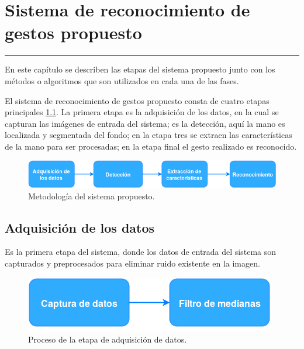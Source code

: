 \chapter{Sistema de reconocimiento de gestos propuesto}\label{capit:cap3}
\vspace{-2.0325ex}%
\noindent
\rule{\textwidth}{0.5pt}
\vspace{-5.5ex}%
\newcommand{\pushline}{\Indp}%

En este cap\'itulo se describen las etapas del sistema propuesto junto con los métodos o algoritmos que son utilizados en cada una de las fases.
 
El sistema de reconocimiento de gestos propuesto consta de cuatro etapas principales \ref{fig:MyHGR}. La primera etapa es la adquisición de los datos, en la cual se capturan las imágenes de entrada del sistema; es la detección, aquí la mano es localizada y segmentada del fondo; en la etapa tres se extraen las características de la mano para ser procesadas; en la etapa final el gesto realizado es reconocido.   

\begin{figure}[h!]
\begin{center}
\includegraphics[scale=.6]{./Figures/MyHGR.png}
\end{center}
\caption{Metodología del sistema propuesto.}
\label{fig:MyHGR}
\end{figure}  
  
\section{Adquisición de los datos}\label{sec:KinectSensor} 

Es la primera etapa del sistema, donde los datos de entrada del sistema son capturados y preprocesados para eliminar ruido existente en la imagen. 

\begin{figure}[h!]
\begin{center}
\includegraphics[scale=.6]{./Figures/Adquisicion.png}
\end{center}
\caption{Proceso de la etapa de adquisición de datos.} 
\label{fig:Dadquisicion}
\end{figure}   

